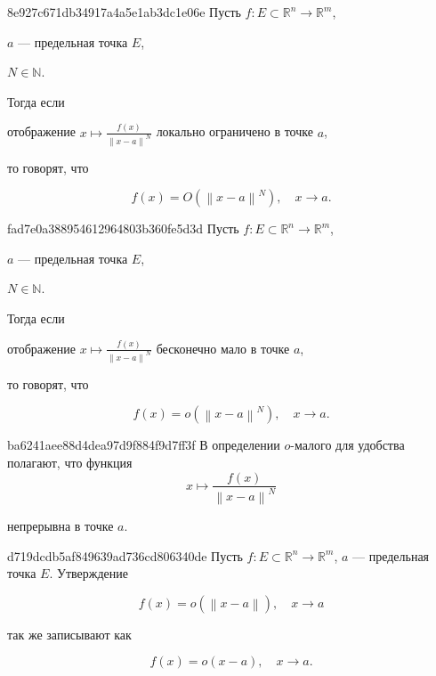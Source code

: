\begin{note}{8e927c671db34917a4a5e1ab3dc1e06e}
    Пусть \({ f : E \subset \mathbb R^{n} \to \mathbb R^{m} }\), \begin{icloze}{3}\({ a }\) --- предельная точка \({ E }\),\end{icloze}\: \begin{icloze}{4}\({ N \in \mathbb N }\).\end{icloze}
    Тогда если \begin{icloze}{2}отображение \({ x \mapsto \frac{f(x)}{\left\lVert x - a \right\rVert^{N}} }\) локально ограничено в точке \({ a }\),\end{icloze} то говорят, что
    \begin{icloze}{1}
        \[
            f(x) = O(\left\lVert x - a \right\rVert^{N}), \quad  x \to a.
        \]
    \end{icloze}
\end{note}

\begin{note}{fad7e0a388954612964803b360fe5d3d}
    Пусть \({ f : E \subset \mathbb R^{n} \to \mathbb R^{m} }\), \begin{icloze}{3}\({ a }\) --- предельная точка \({ E }\),\end{icloze}\: \begin{icloze}{4}\({ N \in \mathbb N }\).\end{icloze}
    Тогда если \begin{icloze}{2}отображение \({ x \mapsto \frac{f(x)}{\left\lVert x - a \right\rVert^{N}} }\) бесконечно мало в точке \({ a }\),\end{icloze} то говорят, что
    \begin{icloze}{1}
        \[
            f(x) = o(\left\lVert x - a \right\rVert^{N}), \quad x \to a.
        \]
    \end{icloze}
\end{note}

\begin{note}{ba6241aee88d4dea97d9f884f9d7ff3f}
    В определении \({ o }\)-малого для удобства полагают, что функция
    \[
        x \mapsto \frac{f(x)}{\left\lVert x - a \right\rVert^{N}}
    \]
    \begin{icloze}{1}непрерывна в точке \({ a }\).\end{icloze}
\end{note}

\begin{note}{d719dcdb5af849639ad736cd806340de}
    Пусть \({ f : E \subset \mathbb R^{n} \to \mathbb R^{m} }\), \({ a }\) --- предельная точка \({ E }\).
    Утверждение
    \begin{icloze}{2}
        \[
            f(x) = o(\left\lVert x - a \right\rVert), \quad x \to a
        \]
    \end{icloze}
    так же записывают как
    \begin{icloze}{1}
        \[
            f(x) = o(x - a), \quad x \to a.
        \]
    \end{icloze}
\end{note}

